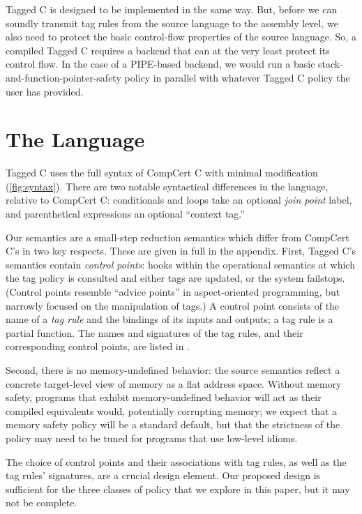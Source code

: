 \documentclass{llncs}
\begin{document}
Tagged C is designed to be implemented in the same way. But, before we can soundly transmit
tag rules from the source language to the assembly level, we also need to protect the basic
control-flow properties of the source language. So, a compiled Tagged C requires a backend that
can at the very least protect its control flow. In the case of a PIPE-based backend, we would
run a basic stack-and-function-pointer-safety policy in parallel with whatever Tagged C policy
the user has provided.

\section{The Language}

Tagged C uses the full syntax of CompCert C \cite{Leroy09:CompCert} with minimal modification (\cref{fig:syntax}).
There are two notable syntactical differences in the language, relative to CompCert C:
conditionals and loops take an optional {\em join point} label, and parenthetical expressions
an optional ``context tag.''

Our semantics are a small-step reduction semantics which differ from CompCert C's in
two key respects. These are given in full in the appendix. First, Tagged C's semantics contain
{\em control points}: hooks within the
operational semantics at which the tag policy is consulted and either tags are updated, or the system
failstops. (Control points resemble ``advice points'' in aspect-oriented programming, but narrowly
focused on the manipulation of tags.) A control point consists of the name of a {\em tag rule}
and the bindings of its inputs and outputs; a tag rule is a partial function. The names and
signatures of the tag rules, and their corresponding control points, are listed in .

Second, there is no memory-undefined behavior: the source semantics reflect a
concrete target-level view of memory as a flat address space. Without memory safety, programs
that exhibit memory-undefined behavior will act as their compiled equivalents would, potentially
corrupting memory; we expect that a memory safety policy will be a standard default, but that the
strictness of the policy may need to be tuned for programs that use low-level idioms.

The choice of control points and their associations with tag rules, as well as the tag rules'
signatures, are a crucial design element. Our proposed design is sufficient for the three classes of
policy that we explore in this paper, but it may not be complete.
\end{document}
